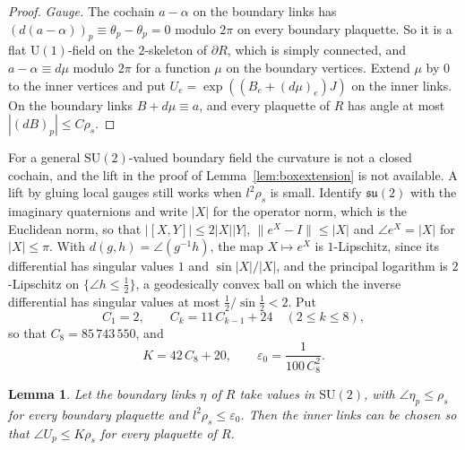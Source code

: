 \documentclass[11pt]{amsart}
\newtheorem{lemma}[theorem]{Lemma}
\theoremstyle{definition}
\theoremstyle{remark}
\numberwithin{equation}{section}
\newcommand{\SU}{\mathrm{SU}}
\newcommand{\U}{\mathrm{U}}
\begin{document}
\begin{proof}
\emph{Gauge.} The cochain $a-\alpha$ on the boundary links has
$(d(a-\alpha))_p\equiv\theta_p-\theta_p=0$ modulo $2\pi$ on every boundary
plaquette. So it is a flat $\U(1)$-field on the $2$-skeleton of $\partial
R$, which is simply connected, and $a-\alpha\equiv d\mu$ modulo $2\pi$ for a
function $\mu$ on the boundary vertices. Extend $\mu$ by $0$ to the inner
vertices and put $U_e=\exp((B_e+(d\mu)_e)J)$ on the inner links. On the
boundary links $B+d\mu\equiv a$, and every plaquette of $R$ has angle at
most $|(dB)_p|\le C\rho_s$.
\end{proof}

For a general $\SU(2)$-valued boundary field the curvature is not a closed
cochain, and the lift in the proof of Lemma~\ref{lem:boxextension} is not
available. A lift by gluing local gauges still works when $l^2\rho_s$ is
small. Identify $\mathfrak{su}(2)$ with the imaginary quaternions and write
$|X|$ for the operator norm, which is the Euclidean norm, so that
$|[X,Y]|\le2|X||Y|$, $\lVert e^X-I\rVert\le|X|$ and $\angle e^X=|X|$ for
$|X|\le\pi$. With $d(g,h)=\angle(g^{-1}h)$, the map $X\mapsto e^X$ is
$1$-Lipschitz, since its differential has singular values $1$ and
$\sin|X|/|X|$, and the principal logarithm is $2$-Lipschitz on $\{\angle
h\le\frac12\}$, a geodesically convex ball on which the inverse
differential has singular values at most $\frac12/\sin\frac12<2$. Put
\[
C_1=2,\qquad C_k=11\,C_{k-1}+24\quad(2\le k\le8),
\]
so that $C_8=85\,743\,550$, and
\[
K=42\,C_8+20,\qquad \varepsilon_0=\frac1{100\,C_8^2}.
\]

\begin{lemma}\label{lem:nonabelianfilling}
Let the boundary links $\eta$ of $R$ take values in $\SU(2)$, with
$\angle\eta_p\le\rho_s$ for every boundary plaquette and $l^2\rho_s\le
\varepsilon_0$. Then the inner links can be chosen so that $\angle U_p\le
K\rho_s$ for every plaquette of $R$.
\end{lemma}
\end{document}
